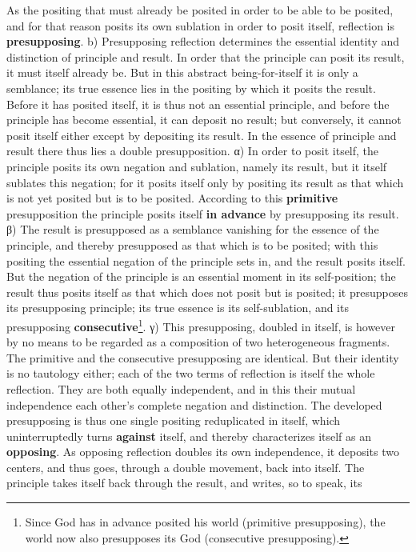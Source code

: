 \documentclass[12pt,a4paper,openany]{book}
\newcommand{\opage}[1]{\marginnote{\footnotesize\textit{[#1]}}}
\begin{document}
As the positing that must already be posited in order to be able to be posited, and for that reason posits its own sublation in order to posit itself, reflection is \textbf{presupposing}.
b) Presupposing reflection determines the essential identity and distinction of principle and result. In order that the principle can posit its result, it must itself already be. But in this abstract being-for-itself it is only a semblance; its true essence lies in the positing by which it posits the result. Before it has posited itself, it is thus not an essential principle, and before the principle has become essential, it can deposit no result; but conversely, it cannot posit itself either except by depositing its result. In the essence of principle and result there thus lies a double presupposition. α) In order to posit itself, the principle posits its own negation and sublation, namely its result, but it itself sublates this negation; for it posits itself only by positing its result as that which is not yet posited but is to be posited. According to this \textbf{primitive} presupposition the principle posits itself \textbf{in advance} by presupposing
\setcounter{footnote}{0}%
\opage{104}its result. β) The result is presupposed as a semblance vanishing for the essence of the principle, and thereby presupposed as that which is to be posited; with this positing the essential negation of the principle sets in, and the result posits itself. But the negation of the principle is an essential moment in its self-position; the result thus posits itself as that which does not posit but is posited; it presupposes its presupposing principle; its true essence is its self-sublation, and its presupposing \textbf{consecutive}\footnote{Since God has in advance posited his world (primitive presupposing), the world now also presupposes its God (consecutive presupposing).}. γ) This presupposing, doubled in itself, is however by no means to be regarded as a composition of two heterogeneous fragments. The primitive and the consecutive presupposing are identical. But their identity is no tautology either; each of the two terms of reflection is itself the whole reflection. They are both equally independent, and in this their mutual independence each other's complete negation and distinction. The developed presupposing is thus one single positing reduplicated in itself, which uninterruptedly turns \textbf{against} itself, and thereby characterizes itself as an \textbf{opposing}. As opposing reflection doubles its own independence, it deposits two centers, and thus goes, through a double movement, back into itself. The principle takes itself back through the result, and writes, so to speak, its
\end{document}
